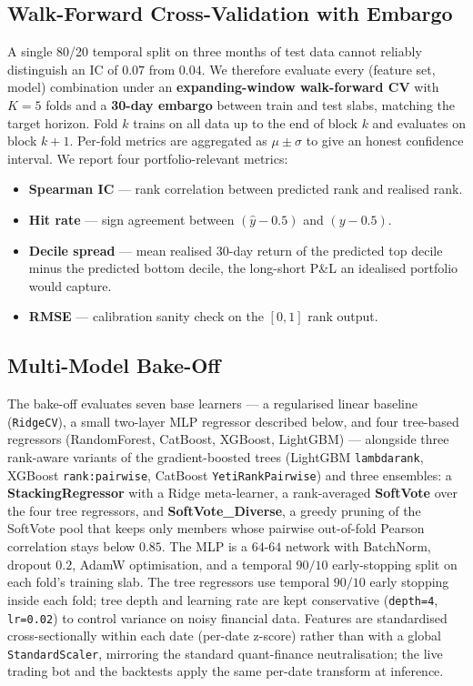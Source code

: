 \documentclass[10pt,journal,compsoc]{IEEEtran}
\begin{document}
\subsection{Walk-Forward Cross-Validation with Embargo}
A single 80/20 temporal split on three months of test data cannot reliably distinguish an IC of $0.07$ from $0.04$. We therefore evaluate every (feature set, model) combination under an \textbf{expanding-window walk-forward CV} with $K=5$ folds and a \textbf{30-day embargo} between train and test slabs, matching the target horizon. Fold $k$ trains on all data up to the end of block $k$ and evaluates on block $k+1$. Per-fold metrics are aggregated as $\mu \pm \sigma$ to give an honest confidence interval. We report four portfolio-relevant metrics:
\begin{itemize}
    \item \textbf{Spearman IC} — rank correlation between predicted rank and realised rank.
    \item \textbf{Hit rate} — sign agreement between $(\hat{y}-0.5)$ and $(y-0.5)$.
    \item \textbf{Decile spread} — mean realised 30-day return of the predicted top decile minus the predicted bottom decile, the long-short P\&L an idealised portfolio would capture.
    \item \textbf{RMSE} — calibration sanity check on the $[0,1]$ rank output.
\end{itemize}

\subsection{Multi-Model Bake-Off}
The bake-off evaluates seven base learners — a regularised linear baseline (\texttt{RidgeCV}), a small two-layer MLP regressor described below, and four tree-based regressors (RandomForest, CatBoost, XGBoost, LightGBM) — alongside three rank-aware variants of the gradient-boosted trees (LightGBM \texttt{lambdarank}, XGBoost \texttt{rank:pairwise}, CatBoost \texttt{YetiRankPairwise}) and three ensembles: a \textbf{StackingRegressor} with a Ridge meta-learner, a rank-averaged \textbf{SoftVote} over the four tree regressors, and \textbf{SoftVote\_Diverse}, a greedy pruning of the SoftVote pool that keeps only members whose pairwise out-of-fold Pearson correlation stays below $0.85$. The MLP is a $64$-$64$ network with BatchNorm, dropout $0.2$, AdamW optimisation, and a temporal $90/10$ early-stopping split on each fold's training slab. The tree regressors use temporal $90/10$ early stopping inside each fold; tree depth and learning rate are kept conservative (\texttt{depth=4}, \texttt{lr=0.02}) to control variance on noisy financial data. Features are standardised cross-sectionally within each date (per-date z-score) rather than with a global \texttt{StandardScaler}, mirroring the standard quant-finance neutralisation; the live trading bot and the backtests apply the same per-date transform at inference.
\end{document}
